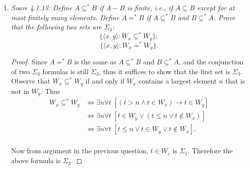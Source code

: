 \documentclass{article}
\begin{document}
\begin{enumerate}[label={\bf Q\arabic*:}]
\begin{proof}
      Thus it suffices to show that the following three sub-formulas
      are $\Sigma_3$: $W_e\cup W_f=\omega$, $W_e\cap W_f$, $W_x\subseteq
      W_e$. Recall that the formula $x\in W_e$ is $\Sigma_1$ because
      \[x\in W_e \Leftrightarrow \exists s,y\; \Phi_{e,s}(x)=y,\]
      and $\Phi_{e,s}(x)=y$ is a $\Delta_0$ formula. Then $x\not\in
      W_e$ is a $\Pi_1$ formula. Hence
      \begin{align*}
        W_e\cup W_f=\omega\; &\Leftrightarrow \forall x\; (x\in W_e \vee
          x\in W_f) &\in\Pi_2,\\
        W_e\cap W_f=\emptyset\; &\Leftrightarrow \forall x\; (x\not\in W_e
          \vee x\not\in W_f) &\in\Pi_1,\\
        W_x\subseteq W_e=\emptyset\; &\Leftrightarrow \forall x\; (x\in W_e
          \vee x\not\in W_x) &\in\Pi_2.\\
      \end{align*}
      Therefore $\varphi(x,y)$ is $\Sigma_3$.
    \end{proof}

  \item \it Soare 4.1.13: Define $A\subseteq^*B$ if $A-B$ is finite, i.e.,
    if $A\subseteq B$ except for at most finitely many elements. Define
    $A=^*B$ if $A\subseteq^*B$ and $B\subseteq^*A$. Prove that the
    following two sets are $\Sigma_3$:
    \[\{\langle x,y\rangle: W_x\subseteq^* W_y\};\]
    \[\{\langle x,y\rangle: W_x=^* W_y\}.\]

    \begin{proof}
      Since $A=^*B$ is the same as $A\subseteq^*B$ and $B\subseteq^*A$, and
      the conjunction of two $\Sigma_3$ formulas is still $\Sigma_3$, thus
      it suffices to show that the first set is $\Sigma_3$. Observe that
      $W_x\subseteq^*W_y$ if and only if $W_x$ contains a largest element
      $n$ that is not in $W_y$. Thus
      \begin{align*}
        W_x\subseteq^* W_y &\Leftrightarrow \exists n\forall t\;
          \left[(t>n \wedge t\in W_x) \rightarrow t\in W_y\right]\\
        &\Leftrightarrow \exists n\forall t\;
          \left[t\in W_y \vee (t\leq n \vee t\not\in W_x)\right]\\
        &\Leftrightarrow \exists n\forall t\;
          \left[t\leq n \vee t\in W_y \vee t\not\in W_x\right].\\
      \end{align*}

      Now from argument in the previous question, $t\in W_e$ is $\Sigma_1$.
      Therefore the above formula is $\Sigma_3$.
    \end{proof}


\end{enumerate}
\end{document}
